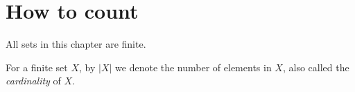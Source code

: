 

\setcounter{section}{1}
\setcounter{subsection}{1}
\setcounter{dfn}{0}

\section{How to count}
All sets in this chapter are finite.

For a finite set $X$, by $|X|$ we denote the number of elements in $X$, also called the \emph{cardinality} of $X$.


